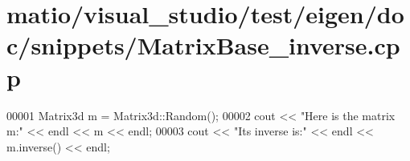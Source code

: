 \hypertarget{matio_2visual__studio_2test_2eigen_2doc_2snippets_2_matrix_base__inverse_8cpp_source}{}\section{matio/visual\+\_\+studio/test/eigen/doc/snippets/\+Matrix\+Base\+\_\+inverse.cpp}
\label{matio_2visual__studio_2test_2eigen_2doc_2snippets_2_matrix_base__inverse_8cpp_source}

\begin{DoxyCode}
00001 Matrix3d m = Matrix3d::Random();
00002 cout << \textcolor{stringliteral}{"Here is the matrix m:"} << endl << m << endl;
00003 cout << \textcolor{stringliteral}{"Its inverse is:"} << endl << m.inverse() << endl;
\end{DoxyCode}

